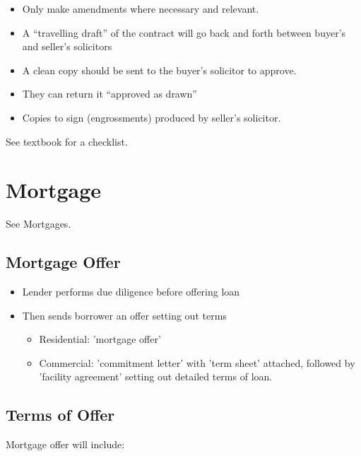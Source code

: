\documentclass[
]{article}
\providecommand{\tightlist}{%
  \setlength{\itemsep}{0pt}\setlength{\parskip}{0pt}}
\begin{document}
\begin{itemize}
\tightlist
\item
  Only make amendments where necessary and relevant.
\item
  A ``travelling draft'' of the contract will go back and forth between
  buyer's and seller's solicitors
\item
  A clean copy should be sent to the buyer's solicitor to approve.
\item
  They can return it ``approved as drawn''
\item
  Copies to sign (engrossments) produced by seller's solicitor.
\end{itemize}

See textbook for a checklist.

\hypertarget{mortgage}{%
\section{Mortgage}\label{mortgage}}

See Mortgages.

\hypertarget{mortgage-offer}{%
\subsection{Mortgage Offer}\label{mortgage-offer}}

\begin{itemize}
\tightlist
\item
  Lender performs due diligence before offering loan
\item
  Then sends borrower an offer setting out terms

  \begin{itemize}
  \tightlist
  \item
    Residential: 'mortgage offer'
  \item
    Commercial: 'commitment letter' with 'term sheet' attached, followed
    by 'facility agreement' setting out detailed terms of loan.
  \end{itemize}
\end{itemize}

\hypertarget{terms-of-offer}{%
\subsection{Terms of Offer}\label{terms-of-offer}}

Mortgage offer will include:
\end{document}
